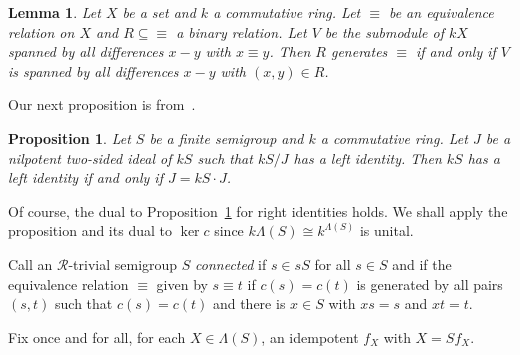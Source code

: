 \documentclass[reqno,11pt]{amsart}
\newtheorem{Prop}[Thm]{Proposition}
\newtheorem{Lemma}[Thm]{Lemma}
{\theoremstyle{definition}
\newtheorem{Def}[Thm]{Definition}}
{\theoremstyle{remark}
\newtheorem{Rmk}[Thm]{Remark}}
\numberwithin{equation}{section}
\begin{document}
\begin{Lemma}\label{l:equiv}
Let $X$ be a set and $k$ a commutative ring.  Let $\equiv$ be an equivalence relation on $X$ and  $R\subseteq {\equiv}$ a binary relation.  Let $V$ be the submodule of $kX$ spanned by all differences $x-y$ with $x\equiv y$.  Then $R$ generates $\equiv$ if and only if $V$ is spanned by all differences $x-y$ with $(x,y)\in R$.  
\end{Lemma}
%


Our next proposition is from~\cite{bandquiver}.


\begin{Prop}\label{p:left.id}
Let $S$ be a finite semigroup and $k$ a commutative ring. Let $J$ be a nilpotent two-sided ideal of $kS$ such that $kS/J$ has a left identity.   Then $kS$ has a left identity if and only  if $J=kS\cdot J$.
\end{Prop}


Of course, the dual to Proposition~\ref{p:left.id} for right identities holds.  We shall apply the proposition and its dual to $\ker c$ since $k\Lambda(S)\cong k^{\Lambda(S)}$ is unital.



Call an $\mathscr R$-trivial semigroup $S$ \emph{connected} if $s\in sS$ for all $s\in S$ and if the equivalence relation $\equiv$ given by $s\equiv t$ if $c(s)=c(t)$ is generated by all pairs $(s,t)$ such that $c(s)=c(t)$ and there is $x\in S$ with $xs=s$ and $xt=t$.


 Fix once and for all, for each $X\in \Lambda(S)$, an idempotent $f_X$ with $X=Sf_X$. 
\end{document}
